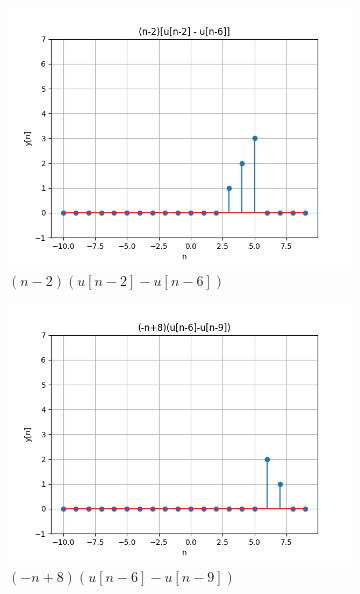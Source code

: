 \documentclass{article}
\begin{document}
\begin{figure}[ht!]
\begin{subfigure}[b]{0.3\textwidth}
        \includegraphics[width=\textwidth]{plot3.png}
        \caption{$(n-2)(u[n-2]-u[n-6])$}
    \end{subfigure}
    \begin{subfigure}[b]{0.3\textwidth}
        \includegraphics[width=\textwidth]{plot4.png}
        \caption{$(-n+8)(u[n-6]-u[n-9])$}
    \end{subfigure}
    \begin{subfigure}[b]{0.3\textwidth}

\end{subfigure}
\end{figure}
\end{document}
